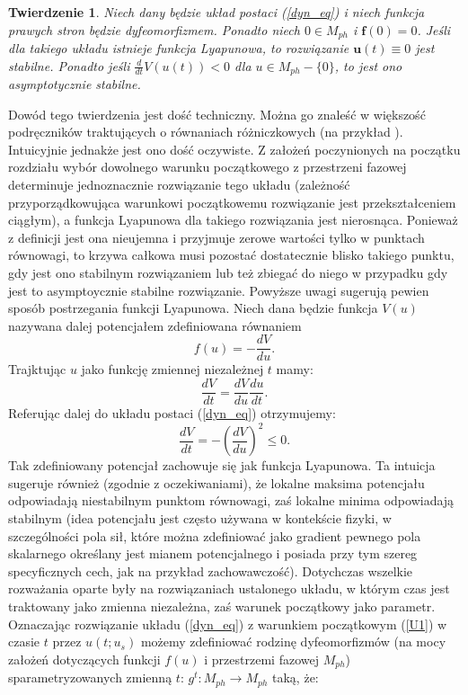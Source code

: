 \documentclass[12pt, twoside]{book}
\newtheorem{tw}{Twierdzenie}
\begin{document}
\begin{tw}
	Niech dany będzie układ postaci (\ref{dyn_eq}) i niech funkcja prawych stron będzie dyfeomorfizmem. Ponadto niech $ 0 \in M_{ph} $ i $ \textbf{f}(0) = 0 $. Jeśli dla takiego układu istnieje funkcja Lyapunowa, to rozwiązanie $ \textbf{u}(t) \equiv 0 $ jest stabilne. Ponadto jeśli $ \frac{d}{dt}V(u(t)) < 0 $ dla $ u \in M_{ph} - \{0\} $, to jest ono asymptotycznie stabilne.
\end{tw}
Dowód tego twierdzenia jest dość techniczny. Można go znaleść w większość podręczników traktujących o równaniach różniczkowych (na przykład \cite{Palczewski}). Intuicyjnie jednakże jest ono dość oczywiste. Z założeń poczynionych na początku rozdziału wybór dowolnego warunku początkowego z przestrzeni fazowej determinuje jednoznacznie rozwiązanie tego układu (zależność przyporządkowująca warunkowi początkowemu rozwiązanie jest przekształceniem ciągłym), a funkcja Lyapunowa dla takiego rozwiązania jest nierosnąca. Ponieważ z definicji jest ona nieujemna i przyjmuje zerowe wartości tylko w punktach równowagi, to krzywa całkowa musi pozostać dostatecznie blisko takiego punktu, gdy jest ono stabilnym rozwiązaniem lub też zbiegać do niego w przypadku gdy jest to asymptoycznie stabilne rozwiązanie.\newline
Powyższe uwagi sugerują pewien sposób postrzegania funkcji Lyapunowa. Niech dana będzie funkcja $ V(u) $ nazywana dalej potencjałem zdefiniowana równaniem 
\begin{equation}
f(u) = -\frac{dV}{du}.
\end{equation}
Trajktując $ u $ jako funkcję zmiennej niezależnej $ t $ mamy:
\begin{equation}
\frac{dV}{dt} = \frac{dV}{du}\frac{du}{dt}.
\end{equation}
Referując dalej do układu postaci (\ref{dyn_eq}) otrzymujemy:
\begin{equation}
\frac{dV}{dt} = -(\frac{dV}{du})^2 \leq 0.
\end{equation}
Tak zdefiniowany potencjał zachowuje się jak funkcja Lyapunowa. Ta intuicja sugeruje również (zgodnie z oczekiwaniami), że lokalne maksima potencjału odpowiadają niestabilnym punktom równowagi, zaś lokalne minima odpowiadają stabilnym (idea potencjału jest często używana w kontekście fizyki, w szczególności pola sił, które można zdefiniować jako gradient pewnego pola skalarnego określany jest mianem potencjalnego i posiada przy tym szereg specyficznych cech, jak na przykład zachowawczość).\newline
Dotychczas wszelkie rozważania oparte były na rozwiązaniach ustalonego układu, w którym czas jest traktowany jako zmienna niezależna, zaś warunek początkowy jako parametr. Oznaczając rozwiązanie układu (\ref{dyn_eq}) z warunkiem początkowym (\ref{U1}) w czasie $ t $ przez $ u(t;u_{s}) $ możemy zdefiniować rodzinę dyfeomorfizmów (na mocy założeń dotyczących funkcji $ f(u) $ i przestrzemi fazowej $ M_{ph} $) sparametryzowanych zmienną $ t $: $ g^t:M_{ph} \rightarrow M_{ph} $ taką, że: 
\end{document}

